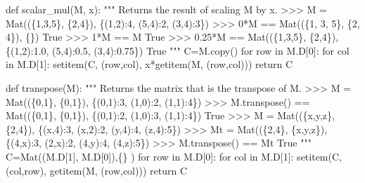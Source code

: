 \documentclass[
  letterpaper,
  DIV=11,
  numbers=noendperiod]{scrartcl}
\newenvironment{Shaded}{\begin{snugshade}}{\end{snugshade}}
\newcommand{\CommentTok}[1]{\textcolor[rgb]{0.37,0.37,0.37}{#1}}
\newcommand{\ControlFlowTok}[1]{\textcolor[rgb]{0.00,0.23,0.31}{#1}}
\newcommand{\DecValTok}[1]{\textcolor[rgb]{0.68,0.00,0.00}{#1}}
\newcommand{\KeywordTok}[1]{\textcolor[rgb]{0.00,0.23,0.31}{#1}}
\newcommand{\NormalTok}[1]{\textcolor[rgb]{0.00,0.23,0.31}{#1}}
\newcommand{\OperatorTok}[1]{\textcolor[rgb]{0.37,0.37,0.37}{#1}}
\begin{document}
\begin{Shaded}
\begin{Highlighting}[numbers=left,,]
\KeywordTok{def}\NormalTok{ scalar\_mul(M, x):}
    \CommentTok{"""}
\CommentTok{    Returns the result of scaling M by x.}
\CommentTok{    \textgreater{}\textgreater{}\textgreater{} M = Mat((\{1,3,5\}, \{2,4\}), \{(1,2):4, (5,4):2, (3,4):3\})}
\CommentTok{    \textgreater{}\textgreater{}\textgreater{} 0*M == Mat((\{1, 3, 5\}, \{2, 4\}), \{\})}
\CommentTok{    True}
\CommentTok{    \textgreater{}\textgreater{}\textgreater{} 1*M == M}
\CommentTok{    True}
\CommentTok{    \textgreater{}\textgreater{}\textgreater{} 0.25*M == Mat((\{1,3,5\}, \{2,4\}), \{(1,2):1.0, (5,4):0.5, (3,4):0.75\})}
\CommentTok{    True}
\CommentTok{    """}
\NormalTok{    C}\OperatorTok{=}\NormalTok{M.copy()}
    \ControlFlowTok{for}\NormalTok{ row }\KeywordTok{in}\NormalTok{ M.D[}\DecValTok{0}\NormalTok{]:}
        \ControlFlowTok{for}\NormalTok{ col }\KeywordTok{in}\NormalTok{ M.D[}\DecValTok{1}\NormalTok{]:}
\NormalTok{            setitem(C, (row,col), x}\OperatorTok{*}\NormalTok{getitem(M, (row,col)))}
    \ControlFlowTok{return}\NormalTok{ C}

\KeywordTok{def}\NormalTok{ transpose(M):}
    \CommentTok{"""}
\CommentTok{    Returns the matrix that is the transpose of M.}
\CommentTok{    \textgreater{}\textgreater{}\textgreater{} M = Mat((\{0,1\}, \{0,1\}), \{(0,1):3, (1,0):2, (1,1):4\})}
\CommentTok{    \textgreater{}\textgreater{}\textgreater{} M.transpose() == Mat((\{0,1\}, \{0,1\}), \{(0,1):2, (1,0):3, (1,1):4\})}
\CommentTok{    True}
\CommentTok{    \textgreater{}\textgreater{}\textgreater{} M = Mat((\{\textquotesingle{}x\textquotesingle{},\textquotesingle{}y\textquotesingle{},\textquotesingle{}z\textquotesingle{}\}, \{2,4\}), \{(\textquotesingle{}x\textquotesingle{},4):3, (\textquotesingle{}x\textquotesingle{},2):2, (\textquotesingle{}y\textquotesingle{},4):4, (\textquotesingle{}z\textquotesingle{},4):5\})}
\CommentTok{    \textgreater{}\textgreater{}\textgreater{} Mt = Mat((\{2,4\}, \{\textquotesingle{}x\textquotesingle{},\textquotesingle{}y\textquotesingle{},\textquotesingle{}z\textquotesingle{}\}), \{(4,\textquotesingle{}x\textquotesingle{}):3, (2,\textquotesingle{}x\textquotesingle{}):2, (4,\textquotesingle{}y\textquotesingle{}):4, (4,\textquotesingle{}z\textquotesingle{}):5\})}
\CommentTok{    \textgreater{}\textgreater{}\textgreater{} M.transpose() == Mt}
\CommentTok{    True}
\CommentTok{    """}
\NormalTok{    C}\OperatorTok{=}\NormalTok{Mat((M.D[}\DecValTok{1}\NormalTok{], M.D[}\DecValTok{0}\NormalTok{]),\{\} )}
    \ControlFlowTok{for}\NormalTok{ row }\KeywordTok{in}\NormalTok{ M.D[}\DecValTok{0}\NormalTok{]:}
        \ControlFlowTok{for}\NormalTok{ col }\KeywordTok{in}\NormalTok{ M.D[}\DecValTok{1}\NormalTok{]:}
\NormalTok{            setitem(C, (col,row), getitem(M, (row,col)))}
    \ControlFlowTok{return}\NormalTok{ C}


\end{Highlighting}
\end{Shaded}
\end{document}
